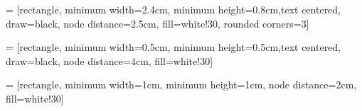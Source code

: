 \usepackage{amsmath}
\usepackage{geometry}
\usepackage{algorithm2e}
\usepackage{microtype}
\usepackage{fancyhdr}
\usepackage{hyperref}
\usepackage{datetime}

\usepackage[utf8]{inputenc}
\usepackage[graphicx]{realboxes}
\usepackage{hyperref}
\usepackage{blindtext}
\usepackage{enumitem}
\usepackage{scrextend}
\usepackage{subcaption}
\usepackage[english]{babel}
\usepackage{adjustbox}
\usepackage{array}
\usepackage[UKenglish]{isodate}

\usepackage{tikz}
\usepackage{mathtools}
\usepackage{relsize}
\usetikzlibrary{plotmarks,arrows,positioning,shapes,calc}

 = [rectangle, minimum width=2.4cm, minimum height=0.8cm,text centered, draw=black, node distance=2.5cm, fill=white!30, rounded corners=3]

 = [rectangle, minimum width=0.5cm, minimum height=0.5cm,text centered, draw=black, node distance=4cm, fill=white!30]

 = [rectangle, minimum width=1cm, minimum height=1cm, node distance=2cm, fill=white!30]

\usepackage{color, colortbl}

\usepackage[backend=bibtex]{biblatex}


\usepackage{lineno}


